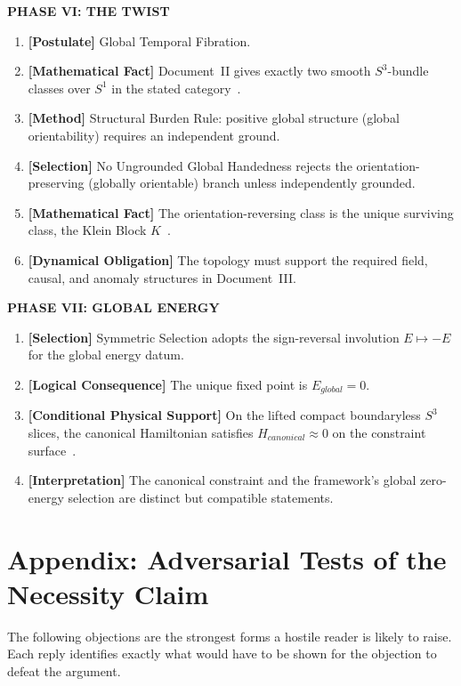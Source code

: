 \documentclass[11pt]{article}
\theoremstyle{canonstyle}
\providecommand{\Klein}{\mathcal{K}}
\providecommand{\Sthree}{S^3}
\def\mathrm#1{#1}%
\def\mathcal#1{#1}%
\begin{document}
\textbf{PHASE VI: THE TWIST}
\begin{enumerate}[resume]
    \item \textbf{[Postulate]} Global Temporal Fibration.
    \item \textbf{[Mathematical Fact]} Document~II gives exactly two smooth $S^3$-bundle classes over $S^1$ in the stated category~\cite{CanonWhat}.
    \item \textbf{[Method]} Structural Burden Rule: positive global structure (global orientability) requires an independent ground.
    \item \textbf{[Selection]} No Ungrounded Global Handedness rejects the orientation-preserving (globally orientable) branch unless independently grounded.
    \item \textbf{[Mathematical Fact]} The orientation-reversing class is the unique surviving class, the Klein Block $\Klein$~\cite{CanonWhat}.
    \item \textbf{[Dynamical Obligation]} The topology must support the required field, causal, and anomaly structures in Document~III.
\end{enumerate}

\textbf{PHASE VII: GLOBAL ENERGY}
\begin{enumerate}[resume]
    \item \textbf{[Selection]} Symmetric Selection adopts the sign-reversal involution $E \mapsto -E$ for the global energy datum.
    \item \textbf{[Logical Consequence]} The unique fixed point is $E_{\mathrm{global}} = 0$.
    \item \textbf{[Conditional Physical Support]} On the lifted compact boundaryless $\Sthree$ slices, the canonical Hamiltonian satisfies $H_{\mathrm{canonical}} \approx 0$ on the constraint surface~\cite{Wald,ADM,CanonWhat}.
    \item \textbf{[Interpretation]} The canonical constraint and the framework's global zero-energy selection are distinct but compatible statements.
\end{enumerate}

\section*{Appendix: Adversarial Tests of the Necessity Claim}
{}

The following objections are the strongest forms a hostile reader is likely to raise. Each reply identifies exactly what would have to be shown for the objection to defeat the argument.
\end{document}
